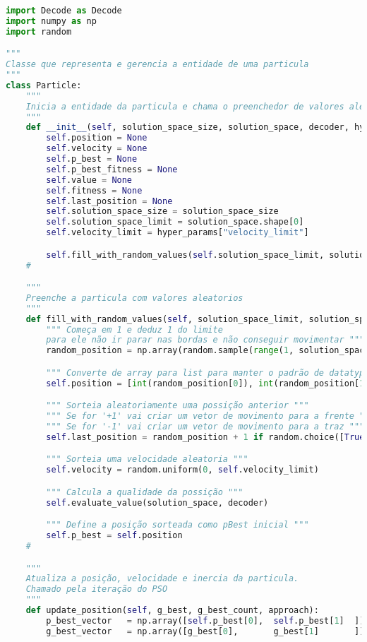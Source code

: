 \begin{lstlisting}[language=Python, caption=Classe de Particula]
import Decode as Decode
import numpy as np
import random

"""
Classe que representa e gerencia a entidade de uma particula
"""
class Particle:
    """
    Inicia a entidade da particula e chama o preenchedor de valores aleatorios
    """
    def __init__(self, solution_space_size, solution_space, decoder, hyper_params):
        self.position = None
        self.velocity = None
        self.p_best = None
        self.p_best_fitness = None
        self.value = None
        self.fitness = None
        self.last_position = None
        self.solution_space_size = solution_space_size
        self.solution_space_limit = solution_space.shape[0]
        self.velocity_limit = hyper_params["velocity_limit"]

        self.fill_with_random_values(self.solution_space_limit, solution_space, decoder)
    #

    """
    Preenche a particula com valores aleatorios
    """
    def fill_with_random_values(self, solution_space_limit, solution_space, decoder):
        """ Começa em 1 e deduz 1 do limite
        para ele não ir parar nas bordas e não conseguir movimentar """
        random_position = np.array(random.sample(range(1, solution_space_limit - 1), 2))

        """ Converte de array para list para manter o padrão de datatype da solução """
        self.position = [int(random_position[0]), int(random_position[1])]

        """ Sorteia aleatoriamente uma possição anterior """
        """ Se for '+1' vai criar um vetor de movimento para a frente """
        """ Se for '-1' vai criar um vetor de movimento para a traz """
        self.last_position = random_position + 1 if random.choice([True, False]) else random_position - 1

        """ Sorteia uma velocidade aleatoria """
        self.velocity = random.uniform(0, self.velocity_limit)

        """ Calcula a qualidade da possição """
        self.evaluate_value(solution_space, decoder)

        """ Define a posição sorteada como pBest inicial """
        self.p_best = self.position
    #

    """
    Atualiza a posição, velocidade e inercia da particula.
    Chamado pela iteração do PSO
    """
    def update_position(self, g_best, g_best_count, approach):
        p_best_vector   = np.array([self.p_best[0],  self.p_best[1]  ])
        g_best_vector   = np.array([g_best[0],       g_best[1]       ])


\end{lstlisting}
